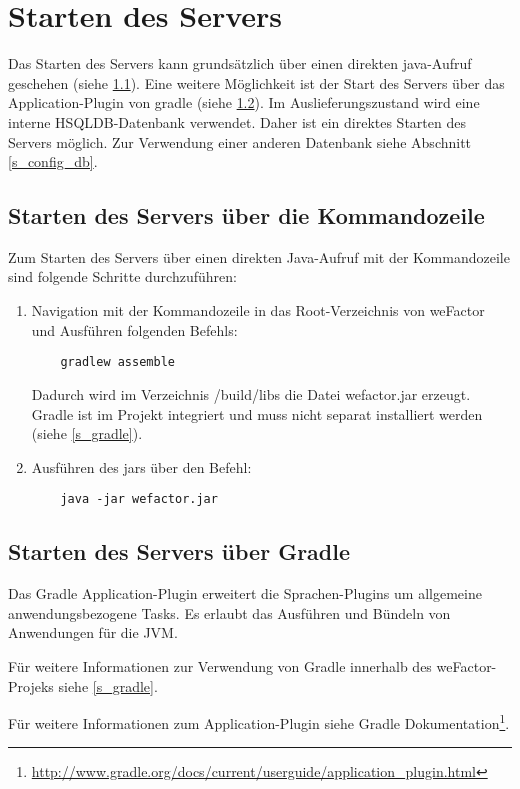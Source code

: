 \section{Starten des Servers}\label{s_startserver}
Das Starten des Servers kann grundsätzlich über einen direkten java-Aufruf geschehen (siehe \ref{s_startserver_java}). Eine weitere Möglichkeit ist der Start des Servers über das Application-Plugin von gradle (siehe \ref{s_startserver_gradle}). Im Auslieferungszustand wird eine interne HSQLDB-Datenbank verwendet. Daher ist ein direktes Starten des Servers möglich. Zur Verwendung einer anderen Datenbank siehe Abschnitt \ref{s_config_db}.

\subsection{Starten des Servers über die Kommandozeile}\label{s_startserver_java}
Zum Starten des Servers über einen direkten Java-Aufruf mit der Kommandozeile sind folgende Schritte durchzuführen:
   \begin{enumerate}

    \item Navigation mit der Kommandozeile in das Root-Verzeichnis von weFactor und Ausführen folgenden Befehls:
    \begin{lstlisting}
    gradlew assemble
    \end{lstlisting}
    Dadurch wird im Verzeichnis /build/libs die Datei wefactor.jar erzeugt. Gradle ist im Projekt integriert und muss nicht separat installiert werden (siehe \ref{s_gradle}).
    \item Ausführen des jars über den Befehl:
    \begin{lstlisting}
    java -jar wefactor.jar
    \end{lstlisting}

   \end{enumerate}


\subsection{Starten des Servers über Gradle}\label{s_startserver_gradle}
Das Gradle Application-Plugin erweitert die Sprachen-Plugins um allgemeine anwendungsbezogene Tasks. Es erlaubt das Ausführen und Bündeln von Anwendungen für die \ac{JVM}.

Für weitere Informationen zur Verwendung von Gradle innerhalb des weFactor-Projeks siehe \ref{s_gradle}.

Für weitere Informationen zum Application-Plugin siehe
Gradle Dokumentation\footnote{\url{http://www.gradle.org/docs/current/userguide/application_plugin.html}}.

